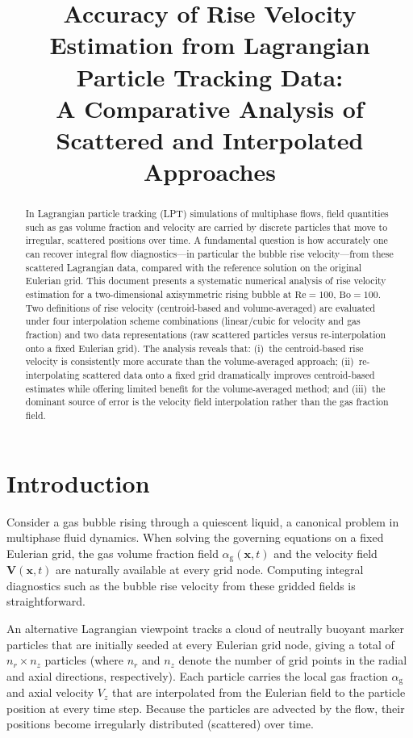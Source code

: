 \documentclass[11pt,a4paper]{article}
\title{%
  Accuracy of Rise Velocity Estimation from Lagrangian Particle Tracking
  Data: \\[4pt]
  A Comparative Analysis of Scattered and Interpolated Approaches}
\author{}
\date{}
\newcommand{\alphag}{\alpha_{\mathrm{g}}}
\newcommand{\Vz}{V_z}
\begin{document}
\maketitle

\begin{abstract}
In Lagrangian particle tracking (LPT) simulations of multiphase flows, field
quantities such as gas volume fraction and velocity are carried by discrete
particles that move to irregular, scattered positions over time.  A
fundamental question is how accurately one can recover integral flow
diagnostics---in particular the bubble rise velocity---from these scattered
Lagrangian data, compared with the reference solution on the original
Eulerian grid.  This document presents a systematic numerical analysis of
rise velocity estimation for a two-dimensional axisymmetric rising bubble at
$\mathrm{Re}=100$, $\mathrm{Bo}=100$.  Two definitions of rise velocity
(centroid-based and volume-averaged) are evaluated under four interpolation
scheme combinations (linear/cubic for velocity and gas fraction) and two
data representations (raw scattered particles versus re-interpolation onto a
fixed Eulerian grid).  The analysis reveals that: (i)~the centroid-based
rise velocity is consistently more accurate than the volume-averaged
approach; (ii)~re-interpolating scattered data onto a fixed grid dramatically
improves centroid-based estimates while offering limited benefit for the
volume-averaged method; and (iii)~the dominant source of error is the
velocity field interpolation rather than the gas fraction field.
\end{abstract}

\section{Introduction}\label{sec:intro}

Consider a gas bubble rising through a quiescent liquid, a canonical problem
in multiphase fluid dynamics.  When solving the governing equations on a
fixed Eulerian grid, the gas volume fraction field
$\alphag(\bm{x},t)$ and the velocity field $\bm{V}(\bm{x},t)$ are
naturally available at every grid node.  Computing integral diagnostics such
as the bubble rise velocity from these gridded fields is straightforward.

An alternative Lagrangian viewpoint tracks a cloud of neutrally buoyant
marker particles that are initially seeded at every Eulerian grid node,
giving a total of $n_r \times n_z$ particles (where $n_r$ and $n_z$ denote
the number of grid points in the radial and axial directions, respectively).
Each particle carries the local gas fraction $\alphag$ and axial velocity
$\Vz$ that are interpolated from the Eulerian field to the particle
position at every time step.  Because the particles are advected by the
flow, their positions become irregularly distributed (scattered) over time.
\end{document}
